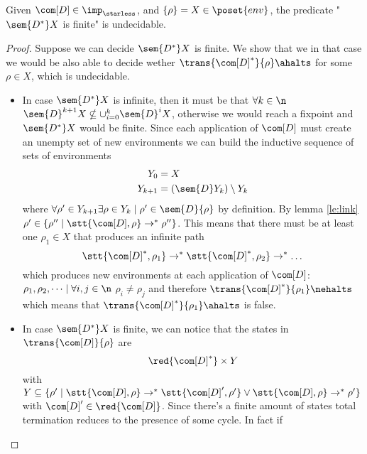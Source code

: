 \begin{lemma}\label{le:infiniteness}
  Given \(\com[D]\in\imp_\starless\), and \(\{\rho\} = X \in
  \poset{env}\), the predicate "\(\sem{D^*}X\) is finite" is
  undecidable.
\end{lemma}

\begin{proof}
  Suppose we can decide \(\sem{D^*}X\) is finite. We show that we in
  that case we would be also able to decide wether
  \(\trans{\com[D]^*}{\rho}\ahalts\) for some \(\rho \in X\), which is
  undecidable.%
  \begin{itemize}
  \item In case \(\sem{D^*}X\) is infinite, then it must be that
    \(\forall k \in \n\) \(\sem{D}^{k+1}X \nsubseteq
    \cup_{i=0}^k\sem{D}^iX\), otherwise we would reach a fixpoint
    and \(\sem{D^*}X\) would be finite. Since each application of
    \(\com[D]\) must create an unempty set of new environments we can
    build the inductive sequence of sets of environments
    \begin{align*}
      Y_0 & = X \\
      Y_{k+1} & = (\sem{D}Y_k)\setminus Y_k
    \end{align*}
    where \(\forall \rho' \in Y_{k+1} \exists \rho \in Y_k \mid \rho'
    \in \sem{D}\{\rho\}\) by definition. By lemma \ref{le:link}
    \(\rho' \in \{\rho'' \mid \stt{\com[D], \rho} \to^*
    \rho''\}\). This means that there must be at least one \(\rho_1\in
    X\) that produces an infinite path \[\stt{\com[D]^*,
      \rho_1}\to^*\stt{\com[D]^*, \rho_2}\to^*\dots \] which produces
    new environments at each application of \(\com[D]\): \(\rho_1,
    \rho_2, \dots \mid \forall i,j \in \n\) \(\rho_i \neq \rho_j\) and
    therefore \(\trans{\com[D]^*}{\rho_1} \nehalts\) which means that
    \(\trans{\com[D]^*}{\rho_1}\ahalts\) is false.
  \item In case \(\sem{D^*}X\) is finite, we can notice that the
    states in \(\trans{\com[D]}{\rho}\) are \[\red{\com[D]^*}\times
    Y\] with \(Y \subseteq \{\rho'\mid \stt{\com[D], \rho} \to^*
    \stt{\com[D]', \rho'} \vee \stt{\com[D],\rho} \to^* \rho'\}\) with
    \(\com[D]'\in \red{\com[D]}\). Since there's a finite amount of
    states total termination reduces to the presence of some cycle. In
    fact if
\end{itemize}
\end{proof}
